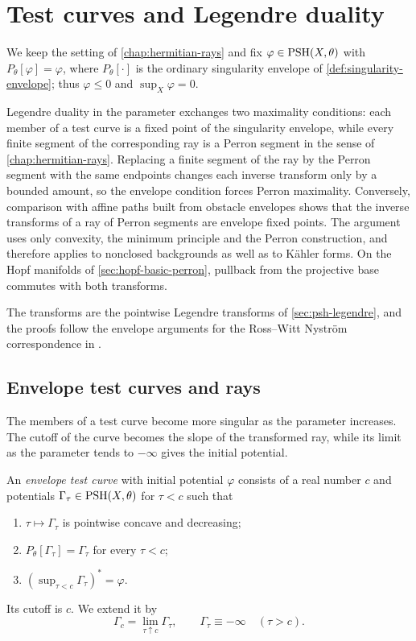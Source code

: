 \chapter{Test curves and Legendre duality}
\label{chap:hermitian-testcurves}

We keep the setting of \cref{chap:hermitian-rays} and fix $\varphi\in\mathrm{PSH}(X,\theta)$ with $P_\theta[\varphi]=\varphi$, where $P_\theta[\cdot]$ is the ordinary singularity envelope of \cref{def:singularity-envelope}; thus $\varphi\leq0$ and $\sup_X\varphi=0$.

Legendre duality in the parameter exchanges two maximality conditions: each member of a test curve is a fixed point of the singularity envelope, while every finite segment of the corresponding ray is a Perron segment in the sense of \cref{chap:hermitian-rays}. Replacing a finite segment of the ray by the Perron segment with the same endpoints changes each inverse transform only by a bounded amount, so the envelope condition forces Perron maximality. Conversely, comparison with affine paths built from obstacle envelopes shows that the inverse transforms of a ray of Perron segments are envelope fixed points. The argument uses only convexity, the minimum principle and the Perron construction, and therefore applies to nonclosed backgrounds as well as to K\"ahler forms. On the Hopf manifolds of \cref{sec:hopf-basic-perron}, pullback from the projective base commutes with both transforms.

The transforms are the pointwise Legendre transforms of \cref{sec:psh-legendre}, and the proofs follow the envelope arguments for the Ross--Witt Nystr\"om correspondence in \cite{SGPT}.

\section{Envelope test curves and rays}

The members of a test curve become more singular as the parameter increases. The cutoff of the curve becomes the slope of the transformed ray, while its limit as the parameter tends to $-\infty$ gives the initial potential.

\begin{definition}\label{def:hermitian-envelope-testcurve}
An \emph{envelope test curve} with initial potential $\varphi$ consists of a real number $c$ and potentials $\Gamma_\tau\in\mathrm{PSH}(X,\theta)$ for $\tau<c$ such that
\begin{enumerate}
\item $\tau\mapsto\Gamma_\tau$ is pointwise concave and decreasing;
\item $P_\theta[\Gamma_\tau]=\Gamma_\tau$ for every $\tau<c$;
\item $(\sup_{\tau<c}\Gamma_\tau)^*=\varphi$.
\end{enumerate}
Its cutoff is $c$. We extend it by
\[
 \Gamma_c=\lim_{\tau\uparrow c}\Gamma_\tau,
 \qquad \Gamma_\tau\equiv-\infty\quad(\tau>c).
\]
\end{definition}

